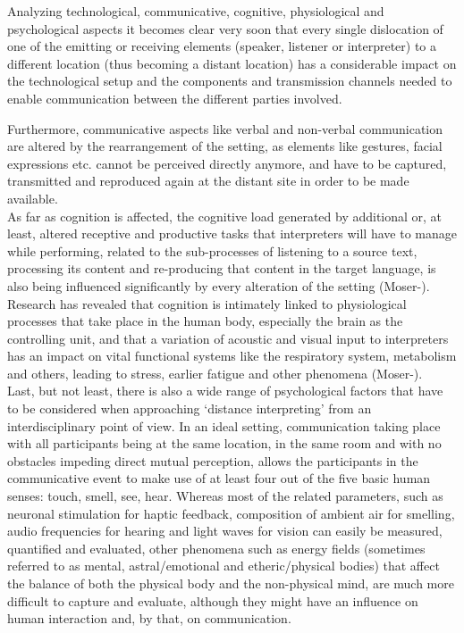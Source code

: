\documentclass[output=paper]{langsci/langscibook}
\begin{document}
Analyzing technological, communicative, cognitive, physiological and psychological aspects it becomes clear very soon that every single dislocation of one of the emitting or receiving elements (speaker, listener or interpreter) to a different location (thus becoming a distant location) has a considerable impact on the technological setup and the components and transmission channels needed to enable communication between the different parties involved. 

Furthermore, communicative aspects like verbal and non-verbal communication are altered by the rearrangement of the setting, as elements like gestures, facial expressions etc. cannot be perceived directly anymore, and have to be captured, transmitted and reproduced again at the distant site in order to be made available. \\
As far as cognition is affected, the cognitive load generated by additional or, at least, altered receptive and productive tasks that interpreters will have to manage while performing, related to the sub-processes of listening to a source text, processing its content and re-producing that content in the target language, is also being influenced significantly by every alteration of the setting (Moser-\citealt{Mercer2005}). Research has revealed that cognition is intimately linked to physiological processes that take place in the human body, especially the brain as the controlling unit, and that a variation of acoustic and visual input to interpreters has an impact on vital functional systems like the respiratory system, metabolism and others, leading to stress, earlier fatigue and other phenomena (Moser-\citealt{Mercer2003}).\\
Last, but not least, there is also a wide range of psychological factors that have to be considered when approaching ‘distance interpreting’ from an interdisciplinary point of view. In an ideal setting, communication taking place with all participants being at the same location, in the same room and with no obstacles impeding direct mutual perception, allows the participants in the communicative event to make use of at least four out of the five basic human senses: touch, smell, see, hear. Whereas most of the related parameters, such as neuronal stimulation for haptic feedback, composition of ambient air for smelling, audio frequencies for hearing and light waves for vision can easily be measured, quantified and evaluated, other phenomena such as energy fields (sometimes referred to as mental, astral/emotional and etheric/physical bodies) that affect the balance of both the physical body and the non-physical mind, are much more difficult to capture and evaluate, although they might have an influence on human interaction and, by that, on communication.
\end{document}
